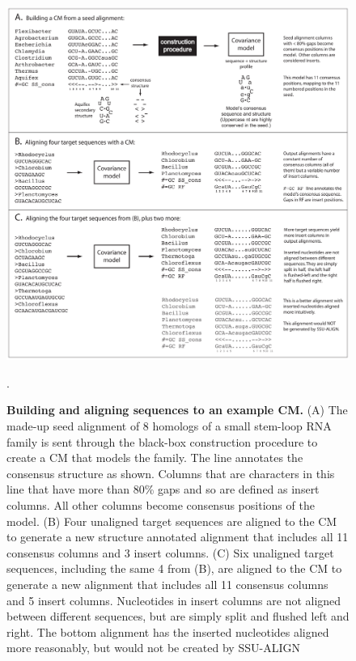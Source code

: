 \begin{figure}
\begin{center}
\includegraphics[width=6.1in]{Figures/sa-toy-example}
\end{center}
\caption{\textbf{Building and aligning sequences to an example CM.}
  (A) The made-up seed alignment of 8 homologs of a small stem-loop RNA
family is sent through the black-box construction procedure to create
a CM that models the family. The  line annotates
the consensus structure as shown. Columns that are  characters
in this line that have more than 80\% gaps and so are defined as insert
columns. All other columns become consensus positions of the
model. (B) Four unaligned target sequences
are aligned to the CM to generate a new structure annotated
alignment that includes all 11 consensus columns and 3 insert
columns. (C) Six unaligned target sequences, including the same 4 from
(B), are aligned to the CM to generate a new alignment that includes
all 11 consensus columns and 5 insert columns. Nucleotides in insert
columns are not aligned between different sequences, but are simply
split and flushed left and right. The bottom alignment has the
inserted nucleotides aligned more reasonably, but would not be created
by SSU-ALIGN}.
\label{fig:toyex}
\end{figure}

